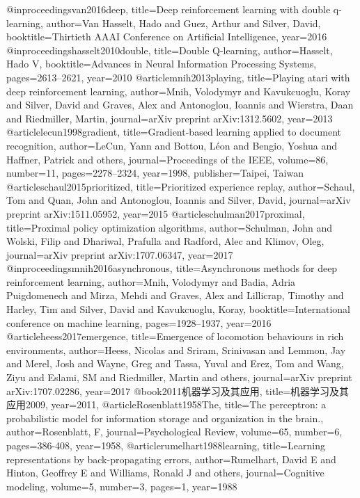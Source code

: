 @inproceedings{van2016deep,
  title={Deep reinforcement learning with double q-learning},
  author={Van Hasselt, Hado and Guez, Arthur and Silver, David},
  booktitle={Thirtieth AAAI Conference on Artificial Intelligence},
  year={2016}
}
@inproceedings{hasselt2010double,
  title={Double Q-learning},
  author={Hasselt, Hado V},
  booktitle={Advances in Neural Information Processing Systems},
  pages={2613--2621},
  year={2010}
}
@article{mnih2013playing,
  title={Playing atari with deep reinforcement learning},
  author={Mnih, Volodymyr and Kavukcuoglu, Koray and Silver, David and Graves, Alex and Antonoglou, Ioannis and Wierstra, Daan and Riedmiller, Martin},
  journal={arXiv preprint arXiv:1312.5602},
  year={2013}
}
@article{lecun1998gradient,
  title={Gradient-based learning applied to document recognition},
  author={LeCun, Yann and Bottou, L{\'e}on and Bengio, Yoshua and Haffner, Patrick and others},
  journal={Proceedings of the IEEE},
  volume={86},
  number={11},
  pages={2278--2324},
  year={1998},
  publisher={Taipei, Taiwan}
}
@article{schaul2015prioritized,
  title={Prioritized experience replay},
  author={Schaul, Tom and Quan, John and Antonoglou, Ioannis and Silver, David},
  journal={arXiv preprint arXiv:1511.05952},
  year={2015}
}
@article{schulman2017proximal,
  title={Proximal policy optimization algorithms},
  author={Schulman, John and Wolski, Filip and Dhariwal, Prafulla and Radford, Alec and Klimov, Oleg},
  journal={arXiv preprint arXiv:1707.06347},
  year={2017}
}
@inproceedings{mnih2016asynchronous,
  title={Asynchronous methods for deep reinforcement learning},
  author={Mnih, Volodymyr and Badia, Adria Puigdomenech and Mirza, Mehdi and Graves, Alex and Lillicrap, Timothy and Harley, Tim and Silver, David and Kavukcuoglu, Koray},
  booktitle={International conference on machine learning},
  pages={1928--1937},
  year={2016}
}
@article{heess2017emergence,
  title={Emergence of locomotion behaviours in rich environments},
  author={Heess, Nicolas and Sriram, Srinivasan and Lemmon, Jay and Merel, Josh and Wayne, Greg and Tassa, Yuval and Erez, Tom and Wang, Ziyu and Eslami, SM and Riedmiller, Martin and others},
  journal={arXiv preprint arXiv:1707.02286},
  year={2017}
}
@book{2011机器学习及其应用,
  title={机器学习及其应用2009},
  year={2011},
}
@article{Rosenblatt1958The,
  title={The perceptron: a probabilistic model for information storage and organization in the brain.},
  author={Rosenblatt, F},
  journal={Psychological Review},
  volume={65},
  number={6},
  pages={386-408},
  year={1958},
}
@article{rumelhart1988learning,
  title={Learning representations by back-propagating errors},
  author={Rumelhart, David E and Hinton, Geoffrey E and Williams, Ronald J and others},
  journal={Cognitive modeling},
  volume={5},
  number={3},
  pages={1},
  year={1988}
}
